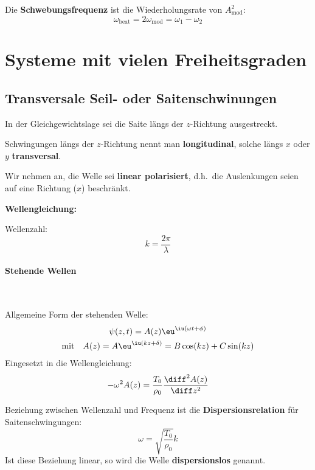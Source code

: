 		Die \textbf{Schwebungsfrequenz} ist die Wiederholungsrate von
		$A_\text{mod}^2$:
		\[
			\omega_\text{beat} = 2\omega_\text{mod} = \omega_1 - \omega_2
		\]
\section{Systeme mit vielen Freiheitsgraden} %
	\subsection{Transversale Seil- oder Saitenschwinungen} %
		In der Gleichgewichtslage sei die Saite längs der $z$-Richtung ausgestreckt.
		
		Schwingungen längs der $z$-Richtung nennt man \textbf{longitudinal}, solche
		längs $x$ oder $y$ \textbf{transversal}.
		
		Wir nehmen an, die Welle sei \textbf{linear polarisiert}, d.h.~die
		Auslenkungen seien auf eine Richtung ($x$) beschränkt.
		
		\textbf{Wellengleichung:}
		
		Wellenzahl:
		\[
			k = \frac{2\pi}\lambda
		\]
		
		\paragraph{Stehende Wellen} %
			~
			
			Allgemeine Form der stehenden Welle:
			\begin{gather*}
				\psi(z,t) = A(z) \eu^{\iu(\omega t + \phi)} \\
				\text{mit} \quad A(z) = A\eu^{\iu(kz+\delta)}
					= B \cos(kz) + C \sin(kz)
			\end{gather*}
			Eingesetzt in die Wellengleichung:
			\begin{equation}
				\label{eq:wellengleichung_saite}
				-\omega^2 A(z) = \frac{T_0}{\rho_0} \frac{\diff^2 A(z)}{\diff z^2}
			\end{equation}
			
			Beziehung zwischen Wellenzahl und Frequenz ist die
			\textbf{Dispersionsrelation} für Saitenschwingungen:
			\[
				\omega = \sqrt{\frac{T_0}{\rho_0}}k
			\]
			Ist diese Beziehung linear, so wird die Welle \textbf{dispersionslos}
			genannt.
			

